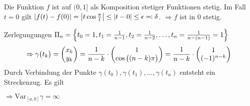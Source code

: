 \documentclass{scrreprt}
\begin{document}
Die Funktion $f$ ist auf $(0, 1]$ als Komposition stetiger Funktionen stetig.
Im Fall $t = 0$ gilt
$\abs{f(t) - f(0)} = \abs{t\cos\frac{\pi}{t}} \leq \abs{t - 0} \leq \epsilon
\eqqcolon \delta$. $\Rightarrow f$ ist in $0$ stetig.

Zerlegungungen $\Pi_n = \qty{
  t_0 = 1, t_1 = \frac{1}{n - 1}, t_2 = \frac{1}{n - 2}, \ldots,
  t_n = \frac{1}{n - (n - 1)} = 1
}$
\[
  \Rightarrow \gamma\qty\big(t_k) = \begin{pmatrix}
    x_k \\
    y_k
  \end{pmatrix} = \frac{1}{n - k} \cdot \begin{pmatrix}
    1 \\
    \cos\qty\big((n - k) \pi)
  \end{pmatrix} = \frac{1}{n - k} \cdot \begin{pmatrix}
    1 \\
    (-1)^{n - k}
  \end{pmatrix}
\]
Durch Verbindung der Punkte $\gamma(t_0), \gamma(t_1), \ldots, \gamma(t_n)$
entsteht ein Streckenzug.
Es gilt
$\Rightarrow \text{Var}_{[a, b]} \gamma = \infty$
\end{document}
